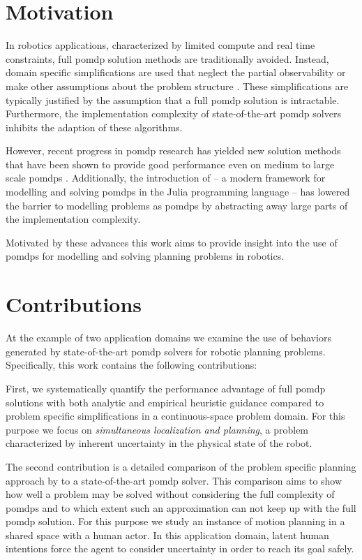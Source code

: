 \section{Motivation}\label{sec:motivation}

In robotics applications, characterized by limited compute and real time
constraints, full \ac{pomdp} solution methods are traditionally avoided.
Instead, domain specific simplifications are used that neglect the partial
observability or make other assumptions about the problem structure
\cite{sadigh2016information, fisac2018probabilistically}. These simplifications
are typically justified by the assumption that a full \ac{pomdp} solution is
intractable. Furthermore, the implementation complexity of state-of-the-art
\ac{pomdp} solvers inhibits the adaption of these algorithms.

However, recent progress in \ac{pomdp} research has yielded new solution methods that
have been shown to provide good performance even on medium to large scale
\acp{pomdp} \cite{somani2013despot,sunberg2018online}. Additionally, the
introduction of \pomdpsjl \cite{egorov2017pomdps} -- a modern framework for
modelling and solving \acp{pomdp} in the Julia programming language -- has
lowered the barrier to modelling problems as \acp{pomdp} by abstracting away
large parts of the implementation complexity.

Motivated by these advances this work aims to provide insight into the use of
\acp{pomdp} for modelling and solving planning problems in robotics.

\section{Contributions}%
\label{sec:contributions}

At the example of two application domains we examine the use of behaviors
generated by state-of-the-art \ac{pomdp} solvers for robotic planning problems.
Specifically, this work contains the following contributions:

First, we systematically quantify the performance advantage of full
\ac{pomdp} solutions with both analytic and empirical heuristic guidance
compared to problem specific simplifications in a continuous-space problem
domain. For this purpose we focus on \emph{simultaneous localization and
planning}, a problem characterized by inherent uncertainty in the physical
state of the robot.

The second contribution is a detailed comparison of the problem specific
planning approach by \cite{fisac2018probabilistically} to a state-of-the-art
\ac{pomdp} solver. This comparison aims to show how well a problem may be
solved without considering the full complexity of \acp{pomdp} and to which
extent such an approximation can not keep up with the full \ac{pomdp} solution.
For this purpose we study an instance of motion planning in a shared space with
a human actor. In this application domain, latent human intentions force the
agent to consider uncertainty in order to reach its goal safely.

